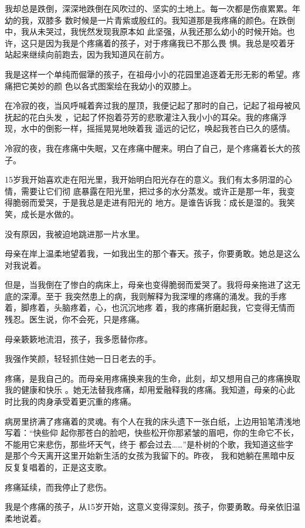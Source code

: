 \documentclass[12pt,a4paper]{article}
\begin{document}
		我却总是跌倒，深深地跌倒在风吹过的、坚实的土地上。每一次都是伤痕累累。年幼的我，双膝多
	数时候是一片青紫或殷红的。我知道那是我疼痛的颜色。在跌倒中，我从未哭过，我恍然发现我原本如
	此坚强，从我还那么幼小的时候开始。也许，这只是因为我是个疼痛着的孩子，对于疼痛我已不那么畏
	惧。我总是咬着牙站起来继续向前跑去，因为我知道风在前方。

		我是这样一个单纯而倔犟的孩子，在祖母小小的花园里追逐着无形无影的希望。疼痛把它美妙的颜
	色以各式图案绘在我幼小的双膝上。

		在冷寂的夜，当风呼喊着奔过我的屋顶，我便记起了那时的自己，记起了祖母被风抚起的花白头发
	，记起了怀抱着芬芳的悲歌灌注入我小小的耳朵。我的疼痛浮现，水中的倒影一样，摇摇晃晃地映着我
	遥远的记忆，唤起我苍白已久的感情。

		冷寂的夜，我在疼痛中失眠，又在疼痛中醒来。明白了自己，是个疼痛着长大的孩子。

		15岁我开始喜欢走在阳光里，我开始明白阳光存在的意义。我们有太多阴湿的心情，需要让它们彻
	底暴露在阳光里，把过多的水分蒸发。或许正是那一年，我变得脆弱而爱哭，于是我总是走进有阳光的
	地方。是谁告诉我：成长是湿的。我笑笑，成长是水做的。

		没有原因，我被迫地跳进那一片水里。

		母亲在岸上温柔地望着我，一如我出生的那个春天。孩子，你要勇敢。她总是这么对我说着。

		但是，当我倒在了惨白的病床上，母亲也变得脆弱而爱哭了。我将母亲拖进了这无底的深潭。至于
	我突然患上的病，我则解释为我深埋的疼痛的涌发。我的手疼着，脚疼着，头脑疼着，心，也沉沉地疼
	着，我的疼痛折磨起我，它变得无情而残忍。医生说，你不会死，只是疼痛。

		母亲簌簌地流泪，孩子，我多愿替你疼。

		我强作笑颜，轻轻抓住她一日日老去的手。

		疼痛，是我自己的。而母亲用疼痛换来我的生命，此刻，却又想用自己的疼痛换取我的健康和快乐
	。她无法替我疼痛，却用爱融释我的疼痛。我知道，母亲的心此时比我的肉身承受着更沉重的疼痛。

		病房里挤满了疼痛着的灵魂。有个人在我的床头遗下一张白纸，上边用铅笔清浅地写着：“快些仰
	起你那苍白的脸吧，快些松开你那紧皱的眉吧，你的生命它不长，不能用它来悲伤，那些坏天气，终于
	都会过去……”是朴树的个歌，我知道这些字是那个今天离开这里开始新生活的女孩为我留下的。昨夜，
	我和她躺在黑暗中反反复复唱着的，正是这支歌。

		疼痛延续，而我停止了悲伤。

		我是个疼痛的孩子，从15岁开始，这意义变得深刻。孩子，你要勇敢。母亲依旧温柔地说着。
\end{document}
